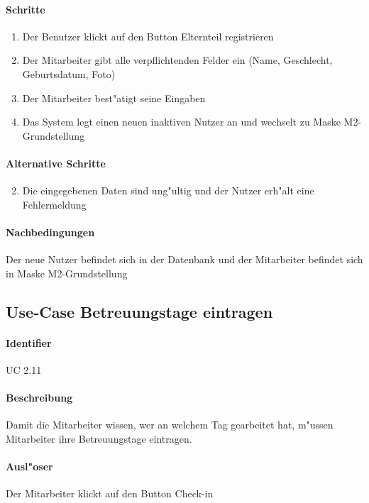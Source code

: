   \paragraph{Schritte}
  \begin{enumerate}
   \item Der Benutzer klickt auf den Button \dq Elternteil registrieren\dq
   \item Der Mitarbeiter gibt alle verpflichtenden Felder ein (Name, Geschlecht, Geburtsdatum, Foto)
   \item Der Mitarbeiter best"atigt seine Eingaben
   \item Das System legt einen neuen inaktiven Nutzer an und wechselt zu Maske M2-Grundstellung 
  \end{enumerate}

  \paragraph{Alternative Schritte}
  \begin{enumerate}
  \setcounter{enumi}{1}
   \item Die eingegebenen Daten sind ung"ultig und der Nutzer erh"alt eine Fehlermeldung
  \end{enumerate}

  \paragraph{Nachbedingungen}
  Der neue Nutzer befindet sich in der Datenbank und der Mitarbeiter befindet sich in Maske M2-Grundstellung

  
  \newpage
 \subsection{Use-Case Betreuungstage eintragen}
  \paragraph{Identifier}
  UC 2.11
  \paragraph{Beschreibung}
  Damit die Mitarbeiter wissen, wer an welchem Tag gearbeitet hat, m"ussen Mitarbeiter ihre Betreuungstage eintragen. 
  \paragraph{Ausl"oser}
  Der Mitarbeiter klickt auf den Button \dq Check-in\dq
